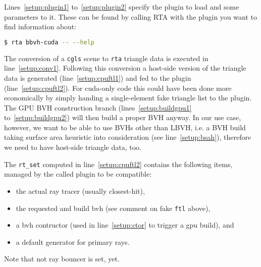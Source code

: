 \documentclass[a4paper,11pt]{scrartcl}
\begin{document}
Lines~\ref{setup:plugin1} to~\ref{setup:plugin2} specify the plugin to load and some parameters to it.
These can be found by calling RTA with the plugin you want to find information about:
\begin{lstlisting}[language=bash]
$ rta bbvh-cuda -- --help
\end{lstlisting}
The conversion of a \lstinline|cgls| scene to \lstinline|rta| triangle data is executed in line~\ref{setup:conv1}.
Following this conversion a host-side version of the triangle data is generated (line~\ref{setup:cpuftl1}) 
	and fed to the plugin (line~\ref{setup:cpuftl2}).
For cuda-only code this could have been done more economically by simply handing a single-element fake triangle list to the plugin.
The GPU BVH construction branch (lines~\ref{setup:buildgpu1} to~\ref{setup:buildgpu2}) will then build a proper BVH anyway.
In our use case, however, we want to be able to use BVHs other than LBVH, 
	i.e. a BVH build taking surface area heuristic into consideration (see line~\ref{setup:bsah}), 
	therefore we need to have host-side triangle data, too.

The \lstinline|rt_set| computed in line~\ref{setup:cpuftl2} contains the following items, managed by the called plugin to be compatible:
\begin{itemize}
\item the actual ray tracer (usually closest-hit),
\item the requested and build bvh (see comment on fake \lstinline|ftl| above),
\item a bvh contructor (used in line~\ref{setup:ctor} to trigger a gpu build), and
\item a default generator for primary rays.
\end{itemize}
Note that not ray bouncer is set, yet.
\end{document}
